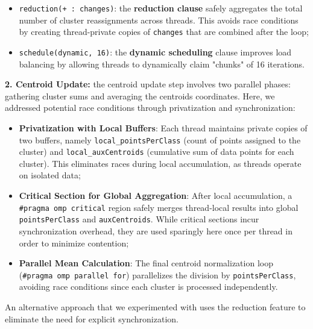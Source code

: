 \documentclass[11pt, journal]{IEEEtran}
\newcommand{\nwl}{

\vspace{11pt}

}
\begin{document}
\begin{itemize}
    \item \texttt{reduction(+ : changes)}: the \textbf{reduction clause} safely aggregates the total number of cluster reassignments across threads. This avoids race conditions by creating thread-private copies of \texttt{changes} that are combined after the loop;
    \item \texttt{schedule(dynamic, 16)}: the \textbf{dynamic scheduling} clause improves load balancing by allowing threads to dynamically claim "chunks" of 16 iterations.
\end{itemize}
\nwl
\noindent \textbf{2. Centroid Update:} the centroid update step involves two parallel phases: gathering cluster sums and averaging the centroids coordinates. Here, we addressed potential race conditions through privatization and synchronization:
\begin{itemize}
    \item \textbf{Privatization with Local Buffers}: Each thread maintains private copies of two buffers, namely \texttt{local\_pointsPerClass} (count of points assigned to the cluster) and \texttt{local\_auxCentroids} (cumulative sum of data points for each cluster). This eliminates races during local accumulation, as threads operate on isolated data;
    \item \textbf{Critical Section for Global Aggregation}: After local accumulation, a \texttt{\#pragma omp critical} region safely merges thread-local results into global \texttt{pointsPerClass} and \texttt{auxCentroids}. While critical sections incur synchronization overhead, they are used sparingly here once per thread in order to minimize contention;
    \item \textbf{Parallel Mean Calculation}: The final centroid normalization loop (\texttt{\#pragma omp parallel for}) parallelizes the division by \texttt{pointsPerClass}, avoiding race conditions since each cluster is processed independently.
\end{itemize}
\nwl
An alternative approach that we experimented with uses the reduction feature to eliminate the need for explicit synchronization.
\end{document}
